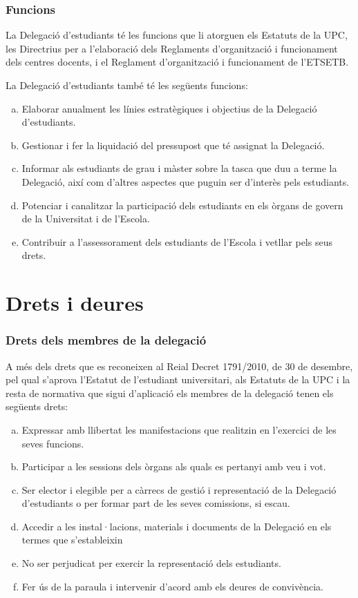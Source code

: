 \documentclass[a4paper,12pt]{article}
\begin{document}
\subsubsection{Funcions}
La Delegació d’estudiants té les funcions que li atorguen els Estatuts de la UPC, les Directrius per a l’elaboració dels Reglaments d’organització i funcionament dels centres docents, i el Reglament d’organització i funcionament de l’ETSETB.

La Delegació d’estudiants també té les següents funcions:
\begin{enumerate}[a)]
	\item Elaborar anualment les línies estratègiques i objectius de la Delegació d’estudiants.
	\item Gestionar i fer la liquidació del pressupost que té assignat la Delegació.
	\item Informar als estudiants de grau i màster sobre la tasca que duu a terme la Delegació, així com d’altres aspectes que puguin ser d’interès pels estudiants.
	\item Potenciar i canalitzar la participació dels estudiants en els òrgans de govern de la Universitat i de l’Escola.
	\item Contribuir a l’assessorament dels estudiants de l’Escola i vetllar pels seus drets.
\end{enumerate}

\section{Drets i deures}
\subsubsection{Drets dels membres de la delegació}
A més dels drets que es reconeixen al Reial Decret 1791/2010, de 30 de desembre, pel qual s’aprova l’Estatut de l’estudiant universitari, als Estatuts de la UPC i la resta de normativa que sigui d’aplicació els membres de la delegació tenen els següents drets:

\begin{enumerate}[a)]
	\item Expressar amb llibertat les manifestacions que realitzin en l’exercici de les seves funcions.
	\item Participar a les sessions dels òrgans als quals es pertanyi amb veu i vot.
	\item Ser elector i elegible per a càrrecs de gestió i representació de la Delegació d’estudiants o per formar part de les seves comissions, si escau.
	\item Accedir a les instal·lacions, materials i documents de la Delegació en els termes que s’estableixin
	\item No ser perjudicat per exercir la representació dels estudiants.
	\item Fer ús de la paraula i intervenir d’acord amb els deures de convivència.
\end{enumerate}
\end{document}
